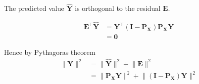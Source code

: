 \begin{result}
    The predicted value $\hat{ \bm{Y}}$ is orthogonal to the residual $\bm{E}$.

    \begin{align*}
        \bm{E}^{\top} \hat{\bm{Y}} &= \bm{Y}^{\top} \left( \bm{I} - \bm{P_X} \right) \bm{P_X} \bm{Y} \\
        &= \bm{0}
    \end{align*}

    Hence by Pythagoras theorem 
    \begin{align*}
        \lVert \bm{Y} \rVert^2 &= \lVert \hat{\bm{Y}} \rVert^2 + \lVert \bm{E} \rVert^2 \\
        &= \lVert \bm{P_X Y} \rVert^2 + \lVert \left( \bm{I} - \bm{P_X} \right) \bm{Y}  \rVert^2
    \end{align*}
\end{result}



\newpage